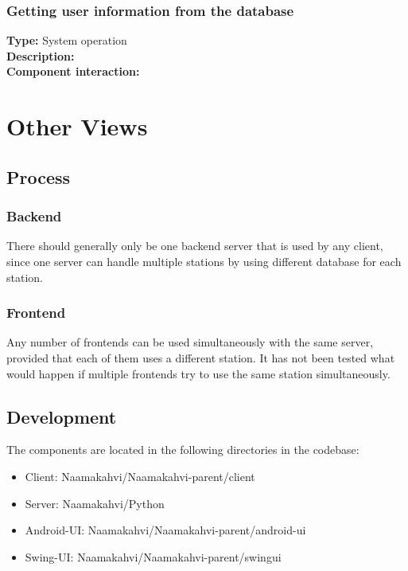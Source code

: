 \documentclass[11pt]{article}
\begin{document}
\subsubsection{Getting user information from the database}
\textbf{Type:} System operation\\
\textbf{Description:} \\
\textbf{Component interaction:}\\


\section{Other Views}


\subsection{Process}
\subsubsection{Backend}
There should generally only be one backend server that is used by any
client, since one server can handle multiple stations by using
different database for each station.

\subsubsection{Frontend}
Any number of frontends can be used simultaneously with the same
server, provided that each of them uses a different station. It has
not been tested what would happen if multiple frontends try to use the
same station simultaneously.

\subsection{Development}

The components are located in the following directories in the codebase:
\begin{itemize}
\item Client: Naamakahvi/Naamakahvi-parent/client

\item Server: Naamakahvi/Python

\item Android-UI: Naamakahvi/Naamakahvi-parent/android-ui

\item Swing-UI: Naamakahvi/Naamakahvi-parent/swingui
\end{itemize}
\end{document}
